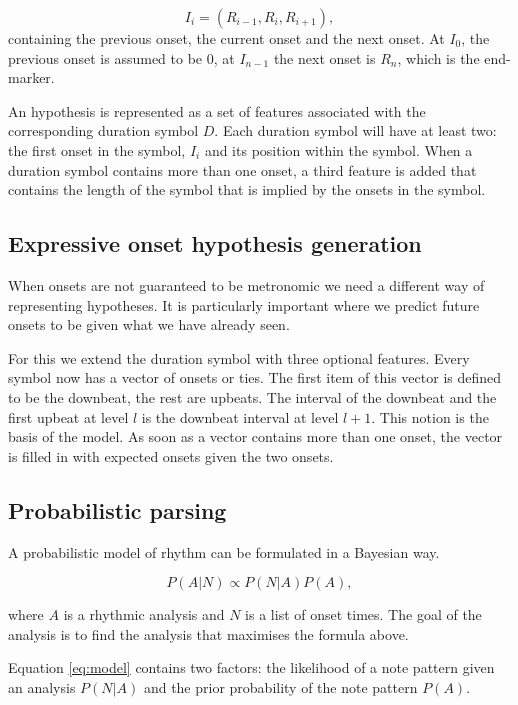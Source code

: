 \documentclass[a4paper,10pt]{article}
\begin{document}
\begin{equation}
I_i = (R_{i-1}, R_i, R_{i+1}),
\end{equation}
containing the previous onset, the current onset and the next onset. At $I_0$, the previous onset is assumed to be $0$, at $I_{n-1}$ the next onset is $R_n$, which is the end-marker. 

An hypothesis is represented as a set of features associated with the corresponding duration symbol $D$. Each duration symbol will have at least two: the first onset in the symbol, $I_i$ and its position within the symbol. When a duration symbol contains more than one onset, a third feature is added that contains the length of the symbol that is implied by the onsets in the symbol.

\subsection{Expressive onset hypothesis generation}

When onsets are not guaranteed to be metronomic we need a different way of representing hypotheses. It is particularly important where we predict future onsets to be given what we have already seen.

For this we extend the duration symbol with three optional features. Every symbol now has a vector of onsets or ties. The first item of this vector is defined to be the downbeat, the rest are upbeats. The interval of the downbeat and the first upbeat at level $l$ is the downbeat interval at level $l+1$. This notion is the basis of the model. As soon as a vector contains more than one onset, the vector is filled in with expected onsets given the two onsets.
\subsection*{Probabilistic parsing}

A probabilistic model of rhythm can be formulated in a Bayesian way. 

\begin{equation}
\label{eq:model}
P(A|N) \propto P(N|A)P(A),
\end{equation}

where $A$ is a rhythmic analysis and $N$ is a list of onset times. The goal of the analysis is to find the analysis that maximises the formula above.

Equation \ref{eq:model} contains two factors: the likelihood of a note pattern given an analysis $P(N|A)$ and the prior probability of the note pattern $P(A)$. 
\end{document}
